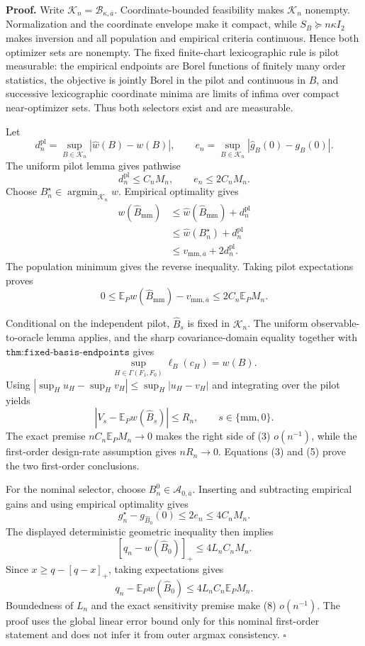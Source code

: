 \textbf{Proof.}
Write \(\mathcal K_n=\mathcal B_{\kappa,\overline a}\).  Coordinate-bounded feasibility makes \(\mathcal K_n\) nonempty.  Normalization and the coordinate envelope make it compact, while \(S_B\succeq n\kappa I_2\) makes inversion and all population and empirical criteria continuous.  Hence both optimizer sets are nonempty.  The fixed finite-chart lexicographic rule is pilot measurable: the empirical endpoints are Borel functions of finitely many order statistics, the objective is jointly Borel in the pilot and continuous in \(B\), and successive lexicographic coordinate minima are limits of infima over compact near-optimizer sets.  Thus both selectors exist and are measurable.

Let
\[
d_n^{\mathrm{pl}}=\sup_{B\in\mathcal K_n}|\widehat w(B)-w(B)|,
\qquad
e_n=\sup_{B\in\mathcal K_n}|\widehat g_B(0)-g_B(0)|.
\]
The uniform pilot lemma gives pathwise
\[
d_n^{\mathrm{pl}}\le C_nM_n,
\qquad e_n\le2C_nM_n.
\tag{1}
\]
Choose \(B_n^\star\in\operatorname*{argmin}_{\mathcal K_n}w\).  Empirical optimality gives
\[
\begin{aligned}
w(\widehat B_{\mathrm{mm}})
&\le\widehat w(\widehat B_{\mathrm{mm}})+d_n^{\mathrm{pl}}\\
&\le\widehat w(B_n^\star)+d_n^{\mathrm{pl}}\\
&\le v_{\mathrm{mm},\overline a}+2d_n^{\mathrm{pl}}.
\end{aligned}
\tag{2}
\]
The population minimum gives the reverse inequality.  Taking pilot expectations proves
\[
0\le\mathbb E_Pw(\widehat B_{\mathrm{mm}})-v_{\mathrm{mm},\overline a}
\le2C_n\mathbb E_PM_n.
\tag{3}
\]

Conditional on the independent pilot, \(\widehat B_s\) is fixed in \(\mathcal K_n\).  The uniform observable-to-oracle lemma applies, and the sharp covariance-domain equality together with \(\texttt{thm:fixed-basis-endpoints}\) gives
\[
\sup_{H\in\Gamma(F_1,F_0)}\ell_B(c_H)=w(B).
\tag{4}
\]
Using \(|\sup_Hu_H-\sup_Hv_H|\le\sup_H|u_H-v_H|\) and integrating over the pilot yields
\[
|V_s-\mathbb E_Pw(\widehat B_s)|\le R_n,
\qquad s\in\{\mathrm{mm},0\}.
\tag{5}
\]
The exact premise \(nC_n\mathbb E_PM_n\to0\) makes the right side of (3) \(o(n^{-1})\), while the first-order design-rate assumption gives \(nR_n\to0\).  Equations (3) and (5) prove the two first-order conclusions.

For the nominal selector, choose \(B_n^0\in\mathcal A_{0,\overline a}\).  Inserting and subtracting empirical gains and using empirical optimality gives
\[
g_n^\star-g_{\widehat B_0}(0)\le2e_n\le4C_nM_n.
\tag{6}
\]
The displayed deterministic geometric inequality then implies
\[
[q_n-w(\widehat B_0)]_+\le4L_nC_nM_n.
\tag{7}
\]
Since \(x\ge q-[q-x]_+\), taking expectations gives
\[
q_n-\mathbb E_Pw(\widehat B_0)\le4L_nC_n\mathbb E_PM_n.
\tag{8}
\]
Boundedness of \(L_n\) and the exact sensitivity premise make (8) \(o(n^{-1})\).  The proof uses the global linear error bound only for this nominal first-order statement and does not infer it from outer argmax consistency. \(\square\)